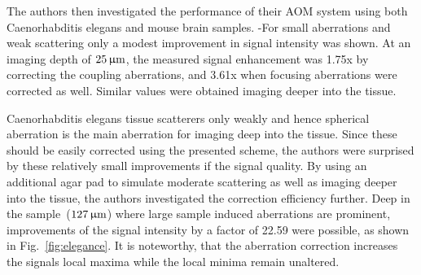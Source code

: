 The authors then investigated the performance of their AOM system using both Caenorhabditis elegans and mouse brain samples. -For small aberrations and weak scattering only a modest improvement in signal intensity was shown. At an imaging depth of $\unit[25]{\upmu m}$, the  measured signal enhancement was 1.75x by correcting the coupling aberrations, and 3.61x when focusing aberrations were corrected as well. Similar values were obtained imaging deeper into the tissue. 

Caenorhabditis elegans tissue scatterers only weakly and hence spherical aberration is the main aberration for imaging deep into the tissue. Since these should be easily corrected using the presented scheme, the authors were surprised by these relatively small improvements if the signal quality. By using an additional agar pad to simulate moderate scattering as well as imaging deeper into the tissue, the authors investigated the correction efficiency further. Deep in the sample~($\unit[127]{\upmu m}$) where large sample induced aberrations are prominent, improvements of the signal intensity by a factor of 22.59 were possible, as shown in Fig.~\ref{fig:elegance}. It is noteworthy, that the aberration correction increases the signals local maxima while the local minima remain unaltered. 

